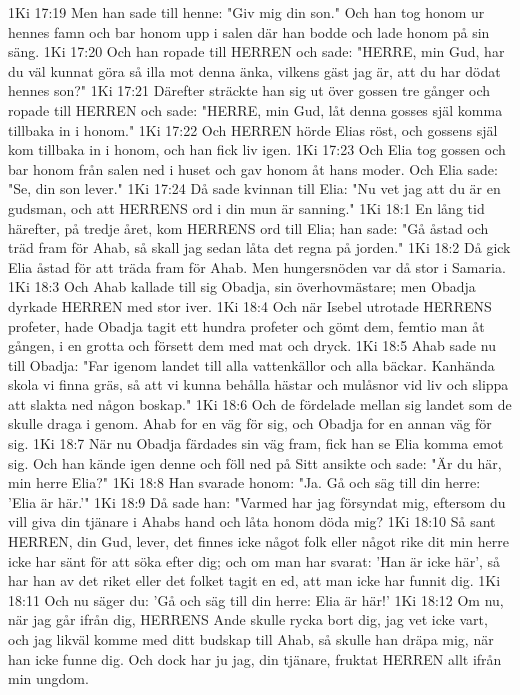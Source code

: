 1Ki 17:19  Men han sade till henne: "Giv mig din son." Och han tog honom ur hennes famn och bar honom upp i salen där han bodde och lade honom på sin säng.
1Ki 17:20  Och han ropade till HERREN och sade: "HERRE, min Gud, har du väl kunnat göra så illa mot denna änka, vilkens gäst jag är, att du har dödat hennes son?"
1Ki 17:21  Därefter sträckte han sig ut över gossen tre gånger och ropade till HERREN och sade: "HERRE, min Gud, låt denna gosses själ komma tillbaka in i honom."
1Ki 17:22  Och HERREN hörde Elias röst, och gossens själ kom tillbaka in i honom, och han fick liv igen.
1Ki 17:23  Och Elia tog gossen och bar honom från salen ned i huset och gav honom åt hans moder. Och Elia sade: "Se, din son lever."
1Ki 17:24  Då sade kvinnan till Elia: "Nu vet jag att du är en gudsman, och att HERRENS ord i din mun är sanning."
1Ki 18:1  En lång tid härefter, på tredje året, kom HERRENS ord till Elia; han sade: "Gå åstad och träd fram för Ahab, så skall jag sedan låta det regna på jorden."
1Ki 18:2  Då gick Elia åstad för att träda fram för Ahab. Men hungersnöden var då stor i Samaria.
1Ki 18:3  Och Ahab kallade till sig Obadja, sin överhovmästare; men Obadja dyrkade HERREN med stor iver.
1Ki 18:4  Och när Isebel utrotade HERRENS profeter, hade Obadja tagit ett hundra profeter och gömt dem, femtio man åt gången, i en grotta och försett dem med mat och dryck.
1Ki 18:5  Ahab sade nu till Obadja: "Far igenom landet till alla vattenkällor och alla bäckar. Kanhända skola vi finna gräs, så att vi kunna behålla hästar och mulåsnor vid liv och slippa att slakta ned någon boskap."
1Ki 18:6  Och de fördelade mellan sig landet som de skulle draga i genom. Ahab for en väg för sig, och Obadja for en annan väg för sig.
1Ki 18:7  När nu Obadja färdades sin väg fram, fick han se Elia komma emot sig. Och han kände igen denne och föll ned på Sitt ansikte och sade: "Är du här, min herre Elia?"
1Ki 18:8  Han svarade honom: "Ja. Gå och säg till din herre: 'Elia är här.'"
1Ki 18:9  Då sade han: "Varmed har jag försyndat mig, eftersom du vill giva din tjänare i Ahabs hand och låta honom döda mig?
1Ki 18:10  Så sant HERREN, din Gud, lever, det finnes icke något folk eller något rike dit min herre icke har sänt för att söka efter dig; och om man har svarat: 'Han är icke här', så har han av det riket eller det folket tagit en ed, att man icke har funnit dig.
1Ki 18:11  Och nu säger du: 'Gå och säg till din herre: Elia är här!'
1Ki 18:12  Om nu, när jag går ifrån dig, HERRENS Ande skulle rycka bort dig, jag vet icke vart, och jag likväl komme med ditt budskap till Ahab, så skulle han dräpa mig, när han icke funne dig. Och dock har ju jag, din tjänare, fruktat HERREN allt ifrån min ungdom.
